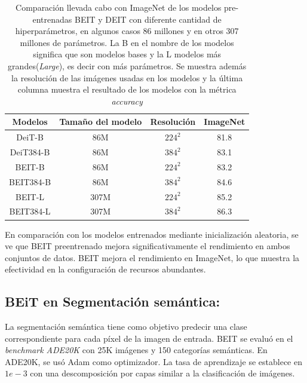 \begin{table}[h!]
    \centering
    \begin{tabular}{||c c c c ||} 
        \hline
        Modelos & Tamaño del modelo & Resolución & ImageNet \\ [0.5ex] 
        \hline\hline
        DeiT-B & 86M & $224^2$ & 81.8 \\ 
        \hline
        DeiT384-B & 86M & $384^2$ & 83.1 \\
        \hline
        BEIT-B & 86M & $224^2$ & 83.2 \\
        \hline
        BEIT384-B & 86M & $384^2$ & 84.6 \\
        \hline
        BEIT-L & 307M & $224^2$ & 85.2 \\
        \hline
        BEIT384-L & 307M & $384^2$ & 86.3 \\ [1ex] 
        \hline
    \end{tabular}
    \caption{Comparación llevada cabo con ImageNet de los modelos pre-entrenadas BEIT y DEIT con diferente cantidad de hiperparámetros, en algunos casos 86 millones y en otros 307 millones de parámetros. La B en el nombre de los modelos significa que son modelos bases y la L modelos más grandes(\textit{Large}), es decir con más parámetros. Se muestra además la resolución de las imágenes usadas en los modelos y la última columna muestra el resultado de los modelos con la métrica \textit{accuracy}}
    \label{table:1}
\end{table}

En comparación con los modelos entrenados mediante inicialización aleatoria, se ve que BEIT preentrenado mejora significativamente el rendimiento en ambos conjuntos de datos. BEIT mejora el rendimiento en ImageNet, lo que muestra la efectividad en la configuración de recursos abundantes.

\subsection{BEiT en Segmentación semántica:}
La segmentación semántica tiene como objetivo predecir una clase correspondiente para cada píxel de la imagen de entrada. BEIT se evaluó en el \textit{benchmark ADE20K} \parencite{94} con 25K imágenes y 150 categorías semánticas. En ADE20K, se usó Adam como optimizador. La tasa de aprendizaje se establece en $1e-3$ con una descomposición por capas similar a la clasificación de imágenes. 

